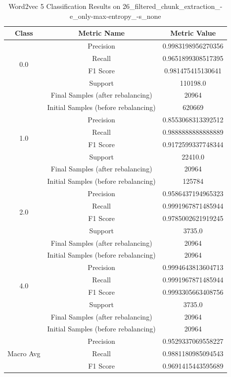 \begin{longtable}{|c|c|c|}
\caption{Word2vec 5 Classification Results on 26\_filtered\_chunk\_extraction\_-e\_only-max-entropy\_-s\_none} \label{tab:26_filtered_chunk_extraction_-e_only-max-entropy_-s_none_word2vec_5_classifiers_results} \\
\hline
Class & Metric Name & Metric Value \\
\hline
\multirow{4}{*}{0.0} & Precision & 0.9983198956270356 \\
 & Recall & 0.9651899308517395 \\
 & F1 Score & 0.981475415130641 \\
 & Support & 110198.0 \\
 & Final Samples (after rebalancing) & 20964 \\
 & Initial Samples (before rebalancing) & 620669 \\
\hline
\multirow{4}{*}{1.0} & Precision & 0.8553068313392512 \\
 & Recall & 0.9888888888888889 \\
 & F1 Score & 0.9172599337748344 \\
 & Support & 22410.0 \\
 & Final Samples (after rebalancing) & 20964 \\
 & Initial Samples (before rebalancing) & 125784 \\
\hline
\multirow{4}{*}{2.0} & Precision & 0.9586437194965323 \\
 & Recall & 0.9991967871485944 \\
 & F1 Score & 0.9785002621919245 \\
 & Support & 3735.0 \\
 & Final Samples (after rebalancing) & 20964 \\
 & Initial Samples (before rebalancing) & 20964 \\
\hline
\multirow{4}{*}{4.0} & Precision & 0.9994643813604713 \\
 & Recall & 0.9991967871485944 \\
 & F1 Score & 0.9993305663408756 \\
 & Support & 3735.0 \\
 & Final Samples (after rebalancing) & 20964 \\
 & Initial Samples (before rebalancing) & 20964 \\
\hline
\multirow{4}{*}{Macro Avg} & Precision & 0.9529337069558227 \\
 & Recall & 0.9881180985094543 \\
 & F1 Score & 0.9691415443595689 \\

\end{longtable}

